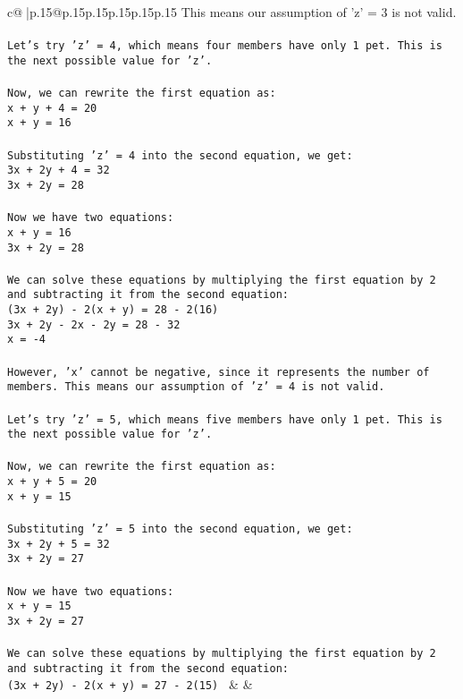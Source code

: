 \documentclass{article}
\begin{document}
{\begin{supertabular}{c@{$\;$}|p{.15\linewidth}@{}p{.15\linewidth}p{.15\linewidth}p{.15\linewidth}p{.15\linewidth}p{.15\linewidth}}
{{{This means our assumption of 'z' = 3 is not valid.\\ \tt \\ \tt Let's try 'z' = 4, which means four members have only 1 pet. This is the next possible value for 'z'.\\ \tt \\ \tt Now, we can rewrite the first equation as:\\ \tt x + y + 4 = 20\\ \tt x + y = 16\\ \tt \\ \tt Substituting 'z' = 4 into the second equation, we get:\\ \tt 3x + 2y + 4 = 32\\ \tt 3x + 2y = 28\\ \tt \\ \tt Now we have two equations:\\ \tt x + y = 16\\ \tt 3x + 2y = 28\\ \tt \\ \tt We can solve these equations by multiplying the first equation by 2 and subtracting it from the second equation:\\ \tt (3x + 2y) - 2(x + y) = 28 - 2(16)\\ \tt 3x + 2y - 2x - 2y = 28 - 32\\ \tt x = -4\\ \tt \\ \tt However, 'x' cannot be negative, since it represents the number of members. This means our assumption of 'z' = 4 is not valid.\\ \tt \\ \tt Let's try 'z' = 5, which means five members have only 1 pet. This is the next possible value for 'z'.\\ \tt \\ \tt Now, we can rewrite the first equation as:\\ \tt x + y + 5 = 20\\ \tt x + y = 15\\ \tt \\ \tt Substituting 'z' = 5 into the second equation, we get:\\ \tt 3x + 2y + 5 = 32\\ \tt 3x + 2y = 27\\ \tt \\ \tt Now we have two equations:\\ \tt x + y = 15\\ \tt 3x + 2y = 27\\ \tt \\ \tt We can solve these equations by multiplying the first equation by 2 and subtracting it from the second equation:\\ \tt (3x + 2y) - 2(x + y) = 27 - 2(15) 
	  } 
	   } 
	   } 
	 & & \\ 
 


\end{supertabular}}
\end{document}
